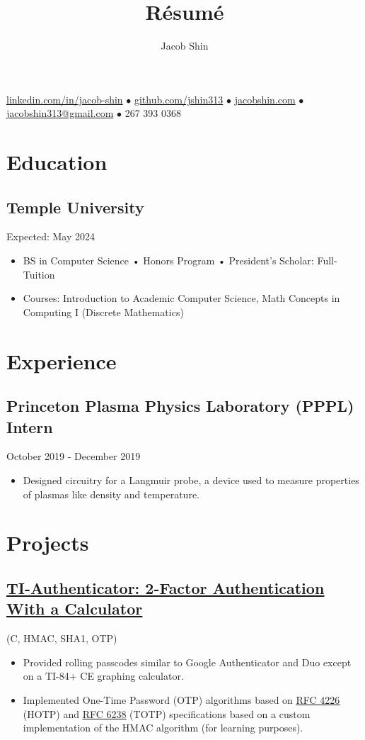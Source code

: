 \documentclass{article}
\makeatletter
\renewcommand{\maketitle}{
    \begin{center}
        {\huge\bfseries
        \theauthor}
    \end{center}
    \begin{center}
        \vspace{1em}
        \leavevmode
        \href{https://linkedin.com/in/jacob-shin}{linkedin.com/in/jacob-shin} $\bullet$ \href{https://github.com/jshin313}{github.com/jshin313} $\bullet$ \href{https://jacobshin.com}{jacobshin.com} $\bullet$ \href{jacobshin313@gmail.com}{jacobshin313@gmail.com} $\bullet$ 267 393 0368
    \end{center}
}
\makeatother
\begin{document}
\title{R\'esum\'e}
\author{Jacob Shin}

\maketitle
\section{Education}
\subsection{Temple University} \hfill Expected: May 2024
\begin{itemize}
    \item BS in Computer Science • Honors Program • President's Scholar: Full-Tuition
    \item Courses: Introduction to Academic Computer Science, Math Concepts in Computing I (Discrete Mathematics)
\end{itemize}

\section{Experience}
\subsection{Princeton Plasma Physics Laboratory (PPPL) Intern}\hfill October 2019 - December 2019
\begin{itemize}
    \item Designed circuitry for a Langmuir probe, a device used to measure properties of plasmas like density and temperature.
\end{itemize}

\section{Projects}
\subsection{\href{https://github.com/jshin313/ti-authenticator}{\underline{TI-Authenticator: 2-Factor Authentication With a Calculator}}} \hfill (C, HMAC, SHA1, OTP)
\begin{itemize}
    \item Provided rolling passcodes similar to Google Authenticator and Duo except on a TI-84+ CE graphing calculator.
    \item Implemented One-Time Password (OTP) algorithms based on \href{https://tools.ietf.org/html/rfc4226}{\underline{RFC 4226}} (HOTP) and \href{https://tools.ietf.org/html/rfc6238}{\underline{RFC 6238}} (TOTP) specifications based on a custom implementation of the HMAC algorithm (for learning purposes).
\end{itemize}
\end{document}
